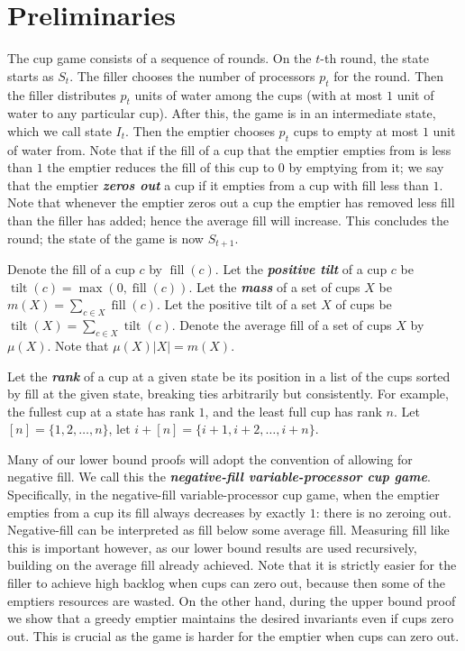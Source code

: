 \documentclass[twocolumn]{article}[10pt]
\newcommand{\defn}[1]{{\textit{\textbf{\boldmath #1}}}\xspace}
\DeclareMathOperator{\tilt}{\text{tilt}}
\DeclareMathOperator{\fil}{\text{fill}}
\begin{document}
\section{Preliminaries}\label{sec:prelims}
The cup game consists of a sequence of rounds. On the $t$-th round, the state
starts as $S_t$. The filler chooses the number of processors $p_t$ for the
round. Then the filler distributes $p_t$ units of water among the cups (with at
most $1$ unit of water to any particular cup). After this, the game is in an
intermediate state, which we call state $I_t$. Then the emptier chooses $p_t$
cups to empty at most $1$ unit of water from. Note that if the fill of a cup
that the emptier empties from is less than $1$ the emptier reduces the fill of
this cup to $0$ by emptying from it; we say that the emptier \defn{zeros out} a
cup if it empties from a cup with fill less than $1$. Note that whenever the
emptier zeros out a cup the emptier has removed less fill than the filler has
added; hence the average fill will increase. This concludes the round; the
state of the game is now $S_{t+1}$.

Denote the fill of a cup $c$ by $\fil(c)$. Let the \defn{positive tilt} of a cup $c$ be
$\tilt(c) = \max(0, \fil(c))$. Let the \defn{mass} of a set of cups $X$
be $m(X) = \sum_{c\in X} \fil(c)$. 
Let the positive tilt of a set $X$ of cups be $\tilt(X) = \sum_{c\in X} \tilt(c)$. 
Denote the average fill of a set of cups $X$
by $\mu(X)$. Note that $\mu(X) |X| = m(X)$.

Let the \defn{rank} of a cup at a given state be its position in a list of the
cups sorted by fill at the given state, breaking ties arbitrarily but
consistently. For example, the fullest cup at a state has rank $1$, and the
least full cup has rank $n$. Let $[n] = \{1,2,\ldots, n\}$, let $i+[n] = \{i+1, i+2, \ldots, i+n\}$.

Many of our lower bound proofs will adopt the convention of allowing for
negative fill. We call this the \defn{negative-fill variable-processor cup
game}. Specifically, in the negative-fill variable-processor cup game, when the
emptier empties from a cup its fill always decreases by exactly $1$: there is
no zeroing out. Negative-fill can be interpreted as fill below some average
fill. Measuring fill like this is important however, as our lower bound results
are used recursively, building on the average fill already achieved. Note that
it is strictly easier for the filler to achieve high backlog when cups can zero
out, because then some of the emptiers resources are wasted. On the other hand,
during the upper bound proof we show that a greedy emptier maintains the
desired invariants even if cups zero out. This is crucial as the game is harder
for the emptier when cups can zero out.
\end{document}
